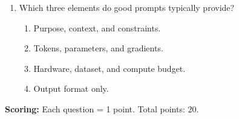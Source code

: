 \documentclass[11pt,a4paper]{article}
\begin{document}
\begin{enumerate}[leftmargin=*, label=\textbf{\#\arabic*}]
  \item Which three elements do good prompts typically provide?\\
    \begin{enumerate}[label=\Alph*)]
      \item Purpose, context, and constraints.
      \item Tokens, parameters, and gradients.
      \item Hardware, dataset, and compute budget.
      \item Output format only.
    \end{enumerate}

\end{enumerate}

\vspace{0.5cm}
	\textbf{Scoring:} Each question = 1 point. Total points: 20.
\end{document}
